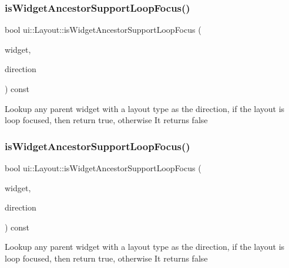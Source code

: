 \subsubsection{\texorpdfstring{is\+Widget\+Ancestor\+Support\+Loop\+Focus()}{isWidgetAncestorSupportLoopFocus()}\hspace{0.1cm}{\footnotesize\ttfamily [1/2]}}
{\footnotesize\ttfamily bool ui\+::\+Layout\+::is\+Widget\+Ancestor\+Support\+Loop\+Focus (\begin{DoxyParamCaption}\item[{\hyperlink{classui_1_1Widget}{Widget} $\ast$}]{widget,  }\item[{\hyperlink{classui_1_1Widget_a8ae8e8fc793a04a87584205cd1e8a8a5}{Focus\+Direction}}]{direction }\end{DoxyParamCaption}) const\hspace{0.3cm}{\ttfamily [protected]}}

Lookup any parent widget with a layout type as the direction, if the layout is loop focused, then return true, otherwise It returns false \mbox{\label{classui_1_1Layout_a3cfeefdfb70916a5673b337ea5b97666}} 
\subsubsection{\texorpdfstring{is\+Widget\+Ancestor\+Support\+Loop\+Focus()}{isWidgetAncestorSupportLoopFocus()}\hspace{0.1cm}{\footnotesize\ttfamily [2/2]}}
{\footnotesize\ttfamily bool ui\+::\+Layout\+::is\+Widget\+Ancestor\+Support\+Loop\+Focus (\begin{DoxyParamCaption}\item[{\hyperlink{classui_1_1Widget}{Widget} $\ast$}]{widget,  }\item[{\hyperlink{classui_1_1Widget_a8ae8e8fc793a04a87584205cd1e8a8a5}{Focus\+Direction}}]{direction }\end{DoxyParamCaption}) const\hspace{0.3cm}{\ttfamily [protected]}}

Lookup any parent widget with a layout type as the direction, if the layout is loop focused, then return true, otherwise It returns false \mbox{\label{classui_1_1Layout_a13b57bb4cec0d694e8053c393499d8b2}} 
